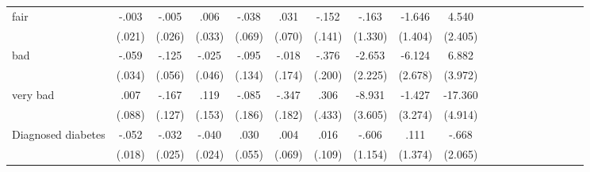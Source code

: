 \documentclass[12pt,english,british]{article}
\newcommand{\sym}[1]{\rlap{#1}}%
\begin{document}
\begin{table}
\begin{center}
\begin{adjustbox}{max width=\linewidth}
{\begin{tabular}{l*{9}{S
S}}
\hspace*{10mm}fair            &    -.003         &    -.005         &     .006         &    -.038         &     .031         &    -.152         &    -.163         &   -1.646         &    4.540\sym{*}  \\
                &   (.021)         &   (.026)         &   (.033)         &   (.069)         &   (.070)         &   (.141)         &  (1.330)         &  (1.404)         &  (2.405)         \\

\hspace*{10mm}bad             &    -.059\sym{*}  &    -.125\sym{**} &    -.025         &    -.095         &    -.018         &    -.376\sym{*}  &   -2.653         &   -6.124\sym{**} &    6.882\sym{*}  \\
                &   (.034)         &   (.056)         &   (.046)         &   (.134)         &   (.174)         &   (.200)         &  (2.225)         &  (2.678)         &  (3.972)         \\

\hspace*{10mm}very bad        &     .007         &    -.167         &     .119         &    -.085         &    -.347\sym{*}  &     .306         &   -8.931\sym{**} &   -1.427         &  -17.360\sym{***}\\
                &   (.088)         &   (.127)         &   (.153)         &   (.186)         &   (.182)         &   (.433)         &  (3.605)         &  (3.274)         &  (4.914)         \\

Diagnosed diabetes&    -.052\sym{***}&    -.032         &    -.040\sym{*}  &     .030         &     .004         &     .016         &    -.606         &     .111         &    -.668         \\
                &   (.018)         &   (.025)         &   (.024)         &   (.055)         &   (.069)         &   (.109)         &  (1.154)         &  (1.374)         &  (2.065)         \\


\end{tabular}}
\end{adjustbox}
\end{center}
\end{table}
\end{document}
